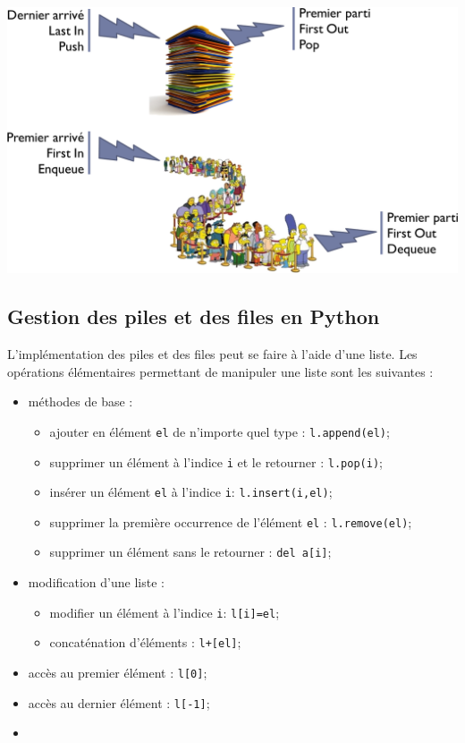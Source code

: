 \documentclass[10pt,fleqn]{article} %
\begin{document}
\begin{minipage}[c]{.45\linewidth}
\includegraphics[width=\linewidth]{images/fifo_lifo}
\end{minipage}
\subsection{Gestion des piles et des files en Python}
L’implémentation des piles et des files peut se faire à l'aide d'une liste. Les opérations élémentaires permettant de manipuler une liste sont les suivantes :
\begin{itemize}[label=,font=\color{ocre}] 
\item méthodes de base :
\begin{itemize}
\item ajouter en élément \texttt{el} de n'importe quel type : \texttt{l.append(el)};
\item supprimer un élément à l'indice \texttt{i} et le retourner : \texttt{l.pop(i)};
\item insérer un élément \texttt{el} à l'indice \texttt{i}: \texttt{l.insert(i,el)};
\item supprimer la première occurrence de l'élément \texttt{el} : \texttt{l.remove(el)};
\item supprimer un élément sans le retourner : \texttt{del a[i]};
\end{itemize}
\item modification d'une liste : 
\begin{itemize}
\item modifier un élément à l'indice \texttt{i}: \texttt{l[i]=el};
\item concaténation d'éléments : \texttt{l+[el]};
\end{itemize}
\item accès au premier élément : \texttt{l[0]};
\item accès au dernier élément : \texttt{l[-1]};
\item 
\end{itemize}
\end{document}
